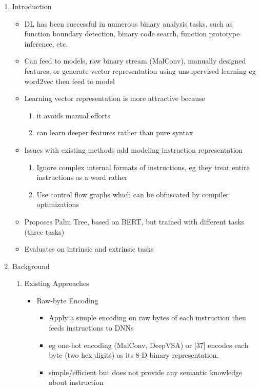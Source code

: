 \documentclass{article}
\begin{document}
\begin{enumerate}
	\item Introduction
	\begin{itemize}
		\item DL has been successful in numerous binary analysis tasks, such as function boundary detection, binary code search, function prototype inference, etc.
		\item Can feed to models, raw binary stream (MalConv), manually designed features, or generate vector representation using unsupervised learning eg word2vec then feed to model
		\item Learning vector representation is more attractive because
		\begin{enumerate}
			\item it avoids manual efforts
			\item can learn deeper features rather than pure syntax
		\end{enumerate}
		\item Issues with existing methods add modeling instruction representation
		\begin{enumerate}
			\item Ignore complex internal formats of instructions, eg they treat entire instructions as a word rather
			\item Use control flow graphs which can be obfuscated by compiler optimizations
		\end{enumerate}
		\item Proposes Palm Tree, based on BERT, but trained with different tasks (three tasks)
		\item Evaluates on intrinsic and extrinsic tasks
	\end{itemize}
	\item Background
	\begin{enumerate}
		\item Existing Approaches
		\begin{itemize}
			\item Raw-byte Encoding
			\begin{itemize}
				\item Apply a simple encoding on raw bytes of each instruction then feeds instructions to DNNs
				\item eg one-hot encoding (MalConv, DeepVSA) or [37] encodes each byte (two hex digits) as its 8-D binary representation.
				\item simple/efficient but does not provide any semantic knowledge about instruction
			\end{itemize}

\end{itemize}
\end{enumerate}
\end{enumerate}
\end{document}
